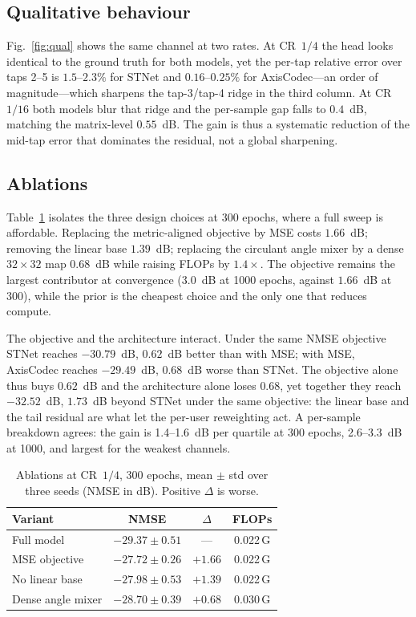 \documentclass[journal]{IEEEtran}
\begin{document}
\subsection{Qualitative behaviour}
Fig.~\ref{fig:qual} shows the same channel at two rates. At CR~$1/4$ the head looks
identical to the ground truth for both models, yet the per-tap relative error over
taps 2--5 is $1.5$--$2.3\%$ for STNet and $0.16$--$0.25\%$ for AxisCodec---an order
of magnitude---which sharpens the tap-3/tap-4 ridge in the third column. At
CR~$1/16$ both models blur that ridge and the per-sample gap falls to $0.4$~dB,
matching the matrix-level $0.55$~dB. The gain is thus a systematic reduction of the
mid-tap error that dominates the residual, not a global sharpening.

\subsection{Ablations}
Table~\ref{tab:abl} isolates the three design choices at 300 epochs, where a full
sweep is affordable. Replacing the metric-aligned objective by MSE costs
$1.66$~dB; removing the linear base $1.39$~dB; replacing the circulant angle mixer
by a dense $32\times32$ map $0.68$~dB while raising FLOPs by $1.4\times$. The
objective remains the largest contributor at convergence ($3.0$~dB at 1000
epochs, against $1.66$~dB at 300), while the prior is the cheapest choice and the
only one that reduces compute.

The objective and the architecture interact. Under the same NMSE objective STNet
reaches $-30.79$~dB, $0.62$~dB better than with MSE; with MSE, AxisCodec reaches
$-29.49$~dB, $0.68$~dB worse than STNet. The objective alone thus buys $0.62$~dB
and the architecture alone loses $0.68$, yet together they reach $-32.52$~dB,
$1.73$~dB beyond STNet under the same objective: the linear base and the tail
residual are what let the per-user reweighting act. A per-sample breakdown agrees: the gain is 1.4--1.6~dB per quartile at 300 epochs,
2.6--3.3~dB at 1000, and largest for the weakest channels.

\begin{table}[!t]
\centering
\caption{Ablations at CR~$1/4$, 300 epochs, mean $\pm$ std over three seeds (NMSE in
dB). Positive $\Delta$ is worse.}
\label{tab:abl}
\footnotesize
\begin{tabular}{@{}lccc@{}}
\toprule
Variant & NMSE & $\Delta$ & FLOPs \\
\midrule
Full model & $\mathbf{-29.37 \pm 0.51}$ & --- & 0.022\,G\\
MSE objective & $-27.72 \pm 0.26$ & $+1.66$ & 0.022\,G\\
No linear base & $-27.98 \pm 0.53$ & $+1.39$ & 0.022\,G\\
Dense angle mixer & $-28.70 \pm 0.39$ & $+0.68$ & 0.030\,G\\
\bottomrule
\end{tabular}
\end{table}
\end{document}
